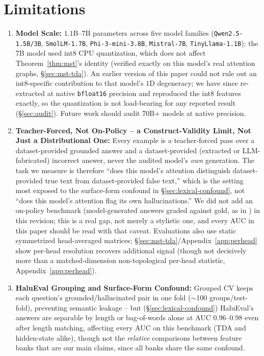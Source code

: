 \documentclass{article}
\begin{document}
\section*{Limitations}
\begin{enumerate}
    \item \textbf{Model Scale:} $1.1$B--$7$B parameters across five model families (\texttt{Qwen2.5-1.5B/3B}, \texttt{SmolLM-1.7B}, \texttt{Phi-3-mini-3.8B}, \texttt{Mistral-7B}, \texttt{TinyLlama-1.1B}); the $7$B model used int8 CPU quantization, which does not affect Theorem~\ref{thm:mst}'s identity (verified exactly on this model's real attention graphs, \S\ref{sec:mst-tda}). An earlier version of this paper could not rule out an int8-specific contribution to that model's $1$D degeneracy; we have since re-extracted at native \texttt{bfloat16} precision and reproduced the int8 features exactly, so the quantization is not load-bearing for any reported result (\S\ref{sec:audit}). Future work should audit $70$B+ models at native precision.
    \item \textbf{Teacher-Forced, Not On-Policy -- a Construct-Validity Limit, Not Just a Distributional One:} Every example is a teacher-forced pass over a dataset-provided grounded answer and a dataset-provided (extracted or LLM-fabricated) incorrect answer, never the audited model's \emph{own} generation. The task we measure is therefore ``does this model's attention distinguish dataset-provided true text from dataset-provided false text,'' which is the setting most exposed to the surface-form confound in \S\ref{sec:lexical-confound}, not ``does this model's attention flag its own hallucinations.'' We did not add an on-policy benchmark (model-generated answers graded against gold, as in \citealp{farquhar2024semantic}) in this revision; this is a real gap, not merely a stylistic one, and every AUC in this paper should be read with that caveat. Evaluations also use static symmetrized head-averaged matrices; \S\ref{sec:mst-tda}/Appendix~\ref{app:perhead} show per-head resolution recovers additional signal (though not decisively more than a matched-dimension non-topological per-head statistic, Appendix~\ref{app:perhead}).
    \item \textbf{HaluEval Grouping and Surface-Form Confound:} Grouped CV keeps each question's grounded/hallucinated pair in one fold ($\sim$100 groups/test-fold), preventing semantic leakage -- but (\S\ref{sec:lexical-confound}) HaluEval's answers are separable by length or bag-of-words alone at AUC $0.96$--$0.98$ even after length matching, affecting every AUC on this benchmark (TDA and hidden-state alike), though not the \emph{relative} comparisons between feature banks that are our main claims, since all banks share the same confound.

\end{enumerate}
\end{document}

